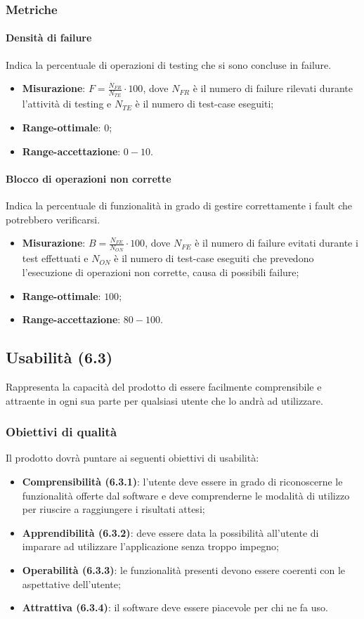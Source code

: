 \subsubsection{Metriche}
\paragraph{Densità di failure}
Indica la percentuale di operazioni di testing che si sono concluse in failure.
\begin{itemize}
\item \textbf{Misurazione}: $F=\frac{N_{FR}}{N_{TE}} \cdot 100$, dove $N_{FR}$ è il numero di failure rilevati durante l'attività di testing e $N_{TE}$ è il numero di test-case eseguiti;
\item \textbf{Range-ottimale}: $0$;
\item \textbf{Range-accettazione}: $0 - 10$.
\end{itemize}
\paragraph{Blocco di operazioni non corrette}
Indica la percentuale di funzionalità in grado di gestire correttamente i fault che potrebbero verificarsi.
\begin{itemize}
\item \textbf{Misurazione}: $B=\frac{N_{FE}}{N_{ON}} \cdot 100$, dove $N_{FE}$ è il numero di failure evitati durante i test effettuati e $N_{ON}$ è il numero di test-case eseguiti che prevedono l'esecuzione di operazioni non corrette, causa di possibili failure;
\item \textbf{Range-ottimale}: $100$;
\item \textbf{Range-accettazione}: $80 - 100$.
\end{itemize}

\subsection{Usabilità (6.3)}
Rappresenta la capacità del prodotto di essere facilmente comprensibile e attraente in ogni sua parte per qualsiasi utente che lo andrà ad utilizzare.
\subsubsection{Obiettivi di qualità}
Il prodotto dovrà puntare ai seguenti obiettivi di usabilità:
\begin{itemize}
\item \textbf{Comprensibilità (6.3.1)}: l'utente deve essere in grado di riconoscerne le funzionalità offerte dal software e deve comprenderne le modalità di utilizzo per riuscire a raggiungere i risultati attesi;
\item \textbf{Apprendibilità (6.3.2)}: deve essere data la possibilità all'utente di imparare ad utilizzare l'applicazione senza troppo impegno;
\item \textbf{Operabilità (6.3.3)}: le funzionalità presenti devono essere coerenti con le aspettative dell'utente;
\item \textbf{Attrattiva (6.3.4)}: il software deve essere piacevole per chi ne fa uso.
\end{itemize}

